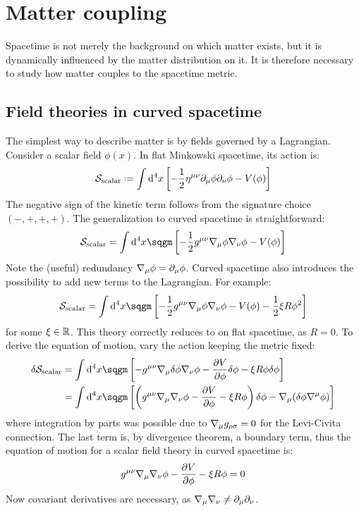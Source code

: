 \newpage
\section{Matter coupling}

Spacetime is not merely the background on which matter exists, but it is dynamically influenced by the matter distribution on it. It is therefore necessary to study how matter couples to the spacetime metric.

\subsection{Field theories in curved spacetime}

The simplest way to describe matter is by fields governed by a Lagrangian. Consider a scalar field $ \phi(x) $. In flat Minkowski spacetime, its action is:
\begin{equation}
  \mathcal{S}_{\text{scalar}} \defeq \int \dd^4 x \left[ - \frac{1}{2} \eta^{\mu \nu} \pa_\mu \phi \pa_\nu \phi - V(\phi) \right]
  \label{eq:scalar-action}
\end{equation}
The negative sign of the kinetic term follows from the signature choice $ (-,+,+,+) $. The generalization to curved spacetime is straightforward:
\begin{equation*}
  \mathcal{S}_{\text{scalar}} = \int \dd^4 x \sqgm \left[ - \frac{1}{2} g^{\mu \nu} \na_\mu \phi \na_\nu \phi - V(\phi) \right]
\end{equation*}
Note the (useful) redundancy $ \nabla_\mu \phi = \partial_\mu \phi $. Curved spacetime also introduces the possibility to add new terms to the Lagrangian. For example:
\begin{equation}
  \mathcal{S}_{\text{scalar}} = \int \dd^4 x \sqgm \left[ - \frac{1}{2} g^{\mu \nu} \na_\mu \phi \na_\nu \phi - V(\phi) - \frac{1}{2} \xi R \phi^2 \right]
  \label{eq:scalar-action-r}
\end{equation}
for some $ \xi \in \mathbb{R} $. This theory correctly reduces to  on flat spacetime, as $ R = 0 $. To derive the equation of motion, vary the action keeping the metric fixed:
\begin{equation*}
  \begin{split}
    \delta \mathcal{S}_{\text{scalar}}
    &= \int \dd^4 x \sqgm \left[ - g^{\mu \nu} \na_\mu \delta \phi \na_\nu \phi - \frac{\pa V}{\pa \phi} \delta \phi - \xi R \phi \delta \phi \right] \\
    &= \int \dd^4 x \sqgm \left[ \left( g^{\mu \nu} \na_\mu \na_\nu \phi - \frac{\pa V}{\pa \phi} - \xi R \phi \right) \delta \phi - \na_\mu ( \delta \phi \na^\mu \phi ) \right]
  \end{split}
\end{equation*}
where integration by parts was possible due to $ \nabla_\mu g_{\rho \sigma} = 0 $ for the Levi-Civita connection. The last term is, by divergence theorem, a boundary term, thus the equation of motion for a scalar field theory in curved spacetime is:
\begin{equation}
  g^{\mu \nu} \nabla_\mu \nabla_\nu \phi - \frac{\partial V}{\partial \phi} - \xi R \phi = 0
\end{equation}
Now covariant derivatives are necessary, as $ \nabla_\mu \nabla_\nu \neq \partial_\mu \partial_\nu $.

